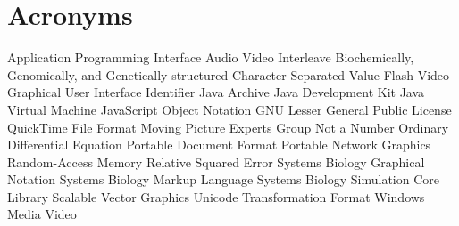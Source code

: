 \chapter{Acronyms}
\begin{acronym}[SBSCL]
  \setlength{\parskip}{0ex}
  \setlength{\itemsep}{0.25ex}
        {Application Programming Interface}
        {Audio Video Interleave}
       {Biochemically, Genomically, and Genetically structured}
        {Character-Separated Value}
        {Flash Video}
        {Graphical User Interface}
         {Identifier}
        {Java\texttrademark{} Archive}
        {Java\texttrademark{} Development Kit}
        {Java\texttrademark{} Virtual Machine}
       {JavaScript Object Notation}
       {GNU Lesser General Public License}
        {QuickTime File Format}
        {Moving Picture Experts Group}
        {Not a Number}
        {Ordinary Differential Equation}
        {Portable Document Format}
        {Portable Network Graphics}
        {Random-Access Memory}
        {Relative Squared Error}
       {Systems Biology Graphical Notation}
       {Systems Biology Markup Language}
      {Systems Biology Simulation Core Library}
        {Scalable Vector Graphics}
        {Unicode Transformation Format}
        {Windows Media Video}
\end{acronym}
